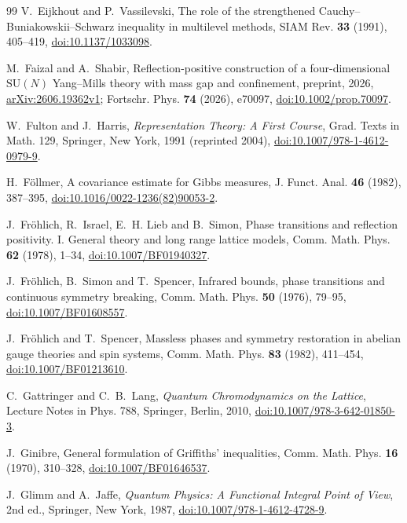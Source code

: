 \documentclass[aps,prd,twocolumn,superscriptaddress,nofootinbib,longbibliography,floatfix,amsmath,amssymb,10pt]{revtex4-2}
\theoremstyle{definition}
\theoremstyle{remark}
\newcommand{\SU}{\mathrm{SU}}
\begin{document}
\begin{thebibliography}{99}
V.~Eijkhout and P.~Vassilevski, The role of the strengthened
Cauchy--Buniakowskii--Schwarz inequality in multilevel methods, SIAM Rev.
\textbf{33} (1991), 405--419,
\href{https://doi.org/10.1137/1033098}{doi:10.1137/1033098}.

M.~Faizal and A.~Shabir, Reflection-positive construction of a
four-dimensional $\SU(N)$ Yang--Mills theory with mass gap and confinement,
preprint, 2026, \href{https://arxiv.org/abs/2606.19362v1}{arXiv:2606.19362v1};
Fortschr. Phys. \textbf{74} (2026), e70097,
\href{https://doi.org/10.1002/prop.70097}{doi:10.1002/prop.70097}.

W.~Fulton and J.~Harris, \emph{Representation Theory: A First Course}, Grad.
Texts in Math. 129, Springer, New York, 1991 (reprinted 2004),
\href{https://doi.org/10.1007/978-1-4612-0979-9}{doi:10.1007/978-1-4612-0979-9}.

H.~F\"ollmer, A covariance estimate for Gibbs measures, J. Funct. Anal. \textbf{46} (1982), 387--395, \href{https://doi.org/10.1016/0022-1236(82)90053-2}{doi:10.1016/0022-1236(82)90053-2}.

J.~Fr\"ohlich, R.~Israel, E.~H. Lieb and B.~Simon, Phase transitions and
reflection positivity. I. General theory and long range lattice models,
Comm. Math. Phys. \textbf{62} (1978), 1--34,
\href{https://doi.org/10.1007/BF01940327}{doi:10.1007/BF01940327}.

J.~Fr\"ohlich, B.~Simon and T.~Spencer, Infrared bounds, phase transitions
and continuous symmetry breaking, Comm. Math. Phys. \textbf{50} (1976),
79--95, \href{https://doi.org/10.1007/BF01608557}{doi:10.1007/BF01608557}.

J.~Fr\"ohlich and T.~Spencer, Massless phases and symmetry restoration in abelian gauge theories and spin systems, Comm. Math. Phys. \textbf{83} (1982), 411--454, \href{https://doi.org/10.1007/BF01213610}{doi:10.1007/BF01213610}.

C.~Gattringer and C.~B.~Lang, \emph{Quantum Chromodynamics on the Lattice},
Lecture Notes in Phys. 788, Springer, Berlin, 2010,
\href{https://doi.org/10.1007/978-3-642-01850-3}{doi:10.1007/978-3-642-01850-3}.

J.~Ginibre, General formulation of Griffiths' inequalities, Comm. Math. Phys. \textbf{16} (1970), 310--328, \href{https://doi.org/10.1007/BF01646537}{doi:10.1007/BF01646537}.

J.~Glimm and A.~Jaffe, \emph{Quantum Physics: A Functional Integral Point
of View}, 2nd ed., Springer, New York, 1987,
\href{https://doi.org/10.1007/978-1-4612-4728-9}{doi:10.1007/978-1-4612-4728-9}.


\end{thebibliography}
\end{document}

